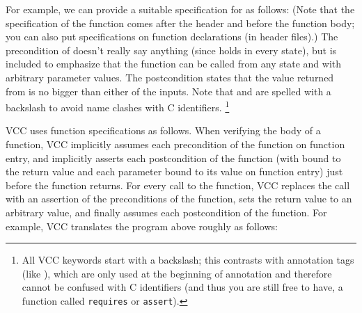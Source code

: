 For example, we can provide a suitable specification for  as
follows:
\noindent
(Note that the specification of the function comes after the header and
before the function body; you can also put specifications on function
declarations (\eg in header files).)
The precondition  of  doesn't
really say anything (since \vcc{\true} holds in every state), but is included
to emphasize that the function can be called from any state and
with arbitrary parameter values.
The postcondition states that the value returned from  
is no bigger than either of the inputs.
Note that \vcc{\true} and \vcc{\result} are spelled with a backslash
to avoid name clashes with C identifiers.%
\footnote{
  All VCC keywords start with a backslash; 
  this contrasts with annotation tags (like ),
  which are only used at the beginning of annotation
  and therefore cannot be confused with C identifiers
  (and thus you are still free to have, \eg
  a function called \lstinline{requires} or \lstinline{assert}).}

VCC uses function specifications as follows. When verifying the body of a
function, VCC implicitly assumes each precondition of the function on
function entry, and implicitly asserts each postcondition of the
function (with \vcc{\result} bound to the return value and each
parameter bound to its value on function entry) just before the
function returns. For every call to the function, VCC replaces the
call with an assertion of the preconditions of the function, sets the
return value to an arbitrary value, and finally assumes each
postcondition of the function. 
For example, VCC translates the program above roughly as follows:


